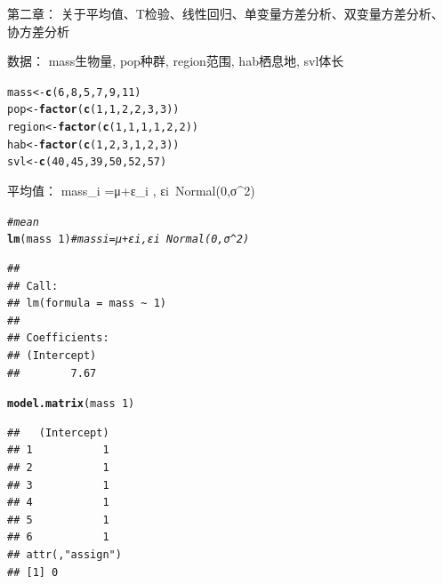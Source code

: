 \documentclass{article}\usepackage[]{graphicx}\usepackage[]{color}
\makeatletter
\newcommand{\hlnum}[1]{\textcolor[rgb]{0.686,0.059,0.569}{#1}}%
\newcommand{\hlcom}[1]{\textcolor[rgb]{0.678,0.584,0.686}{\textit{#1}}}%
\newcommand{\hlopt}[1]{\textcolor[rgb]{0,0,0}{#1}}%
\newcommand{\hlstd}[1]{\textcolor[rgb]{0.345,0.345,0.345}{#1}}%
\newcommand{\hlkwb}[1]{\textcolor[rgb]{0.69,0.353,0.396}{#1}}%
\newcommand{\hlkwd}[1]{\textcolor[rgb]{0.737,0.353,0.396}{\textbf{#1}}}%
\newenvironment{kframe}{%
 \def\at@end@of@kframe{}%
 \ifinner\ifhmode%
  \def\at@end@of@kframe{\end{minipage}}%
  \begin{minipage}{\columnwidth}%
 \fi\fi%
 \def\FrameCommand##1{\hskip\@totalleftmargin \hskip-\fboxsep
 \colorbox{shadecolor}{##1}\hskip-\fboxsep
     \hskip-\linewidth \hskip-\@totalleftmargin \hskip\columnwidth}%
 \MakeFramed {\advance\hsize-\width
   \@totalleftmargin\z@ \linewidth\hsize
   \@setminipage}}%
 {\par\unskip\endMakeFramed%
 \at@end@of@kframe}
\newenvironment{knitrout}{}{} %
\makeatother
\begin{document}
第二章： 关于平均值、T检验、线性回归、单变量方差分析、双变量方差分析、协方差分析
  
数据：
mass生物量, pop种群, region范围, hab栖息地, svl体长
\begin{knitrout}
\color{fgcolor}\begin{kframe}
\begin{alltt}
\hlstd{mass} \hlkwb{<-} \hlkwd{c}\hlstd{(}\hlnum{6}\hlstd{,} \hlnum{8}\hlstd{,} \hlnum{5}\hlstd{,} \hlnum{7}\hlstd{,} \hlnum{9}\hlstd{,} \hlnum{11}\hlstd{)}
\hlstd{pop} \hlkwb{<-} \hlkwd{factor}\hlstd{(}\hlkwd{c}\hlstd{(}\hlnum{1}\hlstd{,} \hlnum{1}\hlstd{,} \hlnum{2}\hlstd{,} \hlnum{2}\hlstd{,} \hlnum{3}\hlstd{,} \hlnum{3}\hlstd{))}
\hlstd{region} \hlkwb{<-} \hlkwd{factor}\hlstd{(}\hlkwd{c}\hlstd{(}\hlnum{1}\hlstd{,} \hlnum{1}\hlstd{,} \hlnum{1}\hlstd{,} \hlnum{1}\hlstd{,} \hlnum{2}\hlstd{,} \hlnum{2}\hlstd{))}
\hlstd{hab} \hlkwb{<-} \hlkwd{factor}\hlstd{(}\hlkwd{c}\hlstd{(}\hlnum{1}\hlstd{,} \hlnum{2}\hlstd{,} \hlnum{3}\hlstd{,} \hlnum{1}\hlstd{,} \hlnum{2}\hlstd{,} \hlnum{3}\hlstd{))}
\hlstd{svl} \hlkwb{<-} \hlkwd{c}\hlstd{(}\hlnum{40}\hlstd{,} \hlnum{45}\hlstd{,} \hlnum{39}\hlstd{,} \hlnum{50}\hlstd{,} \hlnum{52}\hlstd{,} \hlnum{57}\hlstd{)}
\end{alltt}
\end{kframe}
\end{knitrout}

平均值：
 mass_i =μ+ε_i ,    εi~Normal(0,σ^2)
\begin{knitrout}
\color{fgcolor}\begin{kframe}
\begin{alltt}
\hlcom{# mean}
\hlkwd{lm}\hlstd{(mass} \hlopt{~} \hlnum{1}\hlstd{)}  \hlcom{#  massi =μ+εi ,    εi~Normal(0,σ^2)}
\end{alltt}
\begin{verbatim}
## 
## Call:
## lm(formula = mass ~ 1)
## 
## Coefficients:
## (Intercept)  
##        7.67
\end{verbatim}
\begin{alltt}
\hlkwd{model.matrix}\hlstd{(mass} \hlopt{~} \hlnum{1}\hlstd{)}
\end{alltt}
\begin{verbatim}
##   (Intercept)
## 1           1
## 2           1
## 3           1
## 4           1
## 5           1
## 6           1
## attr(,"assign")
## [1] 0
\end{verbatim}
\end{kframe}
\end{knitrout}
\end{document}
